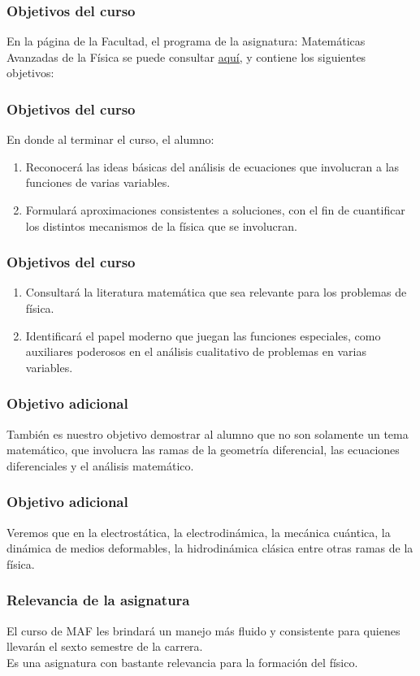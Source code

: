 \documentclass[12pt]{beamer}
\begin{document}
\begin{frame}
\frametitle{Objetivos del curso}
En la página de la Facultad, el programa de la asignatura: Matemáticas Avanzadas de la Física se puede consultar 
\href{https://www.fciencias.unam.mx/sites/default/files/temario/610.pdf}{\underline{aquí}}, y contiene los siguientes objetivos:
\end{frame}
\begin{frame}
\frametitle{Objetivos del curso}
En donde al terminar el curso, el alumno:
\begin{enumerate}[<+->]
\item Reconocerá las ideas básicas del análisis de ecuaciones que involucran a las funciones de varias variables.
\item Formulará aproximaciones consistentes a soluciones, con el fin de cuantificar los distintos mecanismos de la física que se involucran.
\seti
\end{enumerate}
\end{frame}
\begin{frame}
\frametitle{Objetivos del curso}
\begin{enumerate}[<+->]
\conti
\item Consultará la literatura matemática que sea relevante para los problemas de física.
\item Identificará el papel moderno que juegan las funciones especiales, como auxiliares poderosos en el análisis cualitativo de problemas en varias variables.
\end{enumerate}
\end{frame}
\begin{frame}
\frametitle{Objetivo adicional}
También es nuestro objetivo demostrar al alumno que  no son solamente un tema matemático, que involucra las ramas de la geometría diferencial, las ecuaciones diferenciales y el análisis matemático.
\end{frame}
\begin{frame}
\frametitle{Objetivo adicional}
Veremos que  en la electrostática, la electrodinámica, la mecánica cuántica, la dinámica de medios deformables, la hidrodinámica clásica entre otras ramas de la física.
\end{frame}
\begin{frame}
\frametitle{Relevancia de la asignatura}
El curso de MAF les brindará un manejo más fluido y consistente para quienes llevarán el sexto semestre de la carrera.
\\
\bigskip
\pause
Es una asignatura con bastante relevancia para la formación del físico.
\end{frame}
\end{document}
